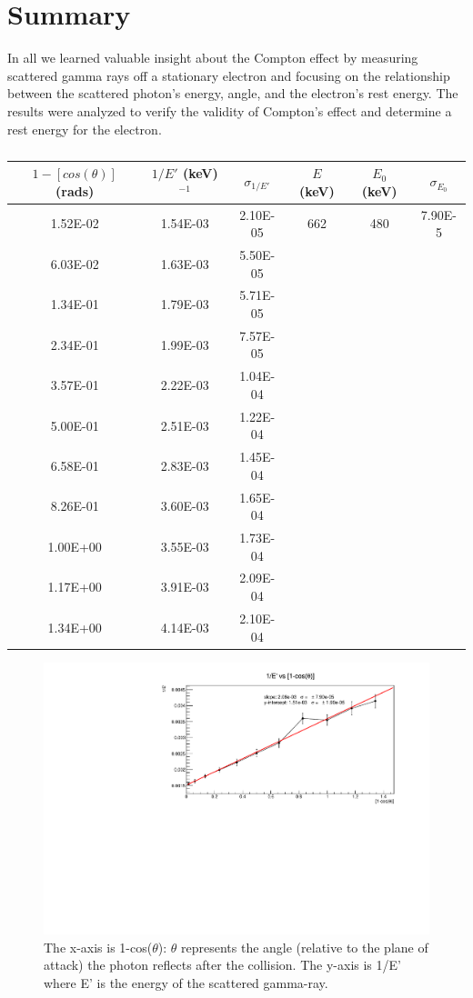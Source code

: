 \documentclass[a4paper,12pt,english]{all-in-one} %
\begin{document}
\section*{Summary}
{
 In all we learned valuable insight about the Compton effect by measuring scattered gamma rays off a stationary electron and focusing on the relationship between the scattered photon’s energy, angle, and the electron’s rest energy. The results were analyzed to verify the validity of Compton's effect and determine a rest energy for the electron.
}

\begin{table}[!]
\centering
\begin{tabular}{c|c|c|c|c|c} 
$1-[cos(\theta)]$ (rads) & $1/E'$ (keV)$^{-1}$  & $\sigma_{1/E'}$ & $E$ (keV)  &$E_0$ (keV) & $\sigma_{E_0}$ \\ \hline

1.52E-02 & 1.54E-03 & 2.10E-05 & 662 & 480 & 7.90E-5 \\
6.03E-02 & 1.63E-03 & 5.50E-05 &  &  &  \\
1.34E-01 & 1.79E-03 & 5.71E-05 &  &  & \\
2.34E-01 & 1.99E-03 & 7.57E-05 &  &  &  \\
3.57E-01 & 2.22E-03 & 1.04E-04 &  &  &  \\
5.00E-01 & 2.51E-03 & 1.22E-04 &  &  &  \\
6.58E-01 & 2.83E-03 & 1.45E-04 &  &  &  \\
8.26E-01 & 3.60E-03 & 1.65E-04 &  &  &  \\
1.00E+00 & 3.55E-03 & 1.73E-04 &  &  &  \\
1.17E+00 & 3.91E-03 & 2.09E-04 &  &  &  \\
1.34E+00 & 4.14E-03 & 2.10E-04 &  &  &  \\
\end{tabular}
\caption{}
\label{tab:data_compton}
\end{table}

\begin{figure}[tbh]
    \centering
    \includegraphics[width=1.0\linewidth]{6-compton/images/COMPTON-DATA.pdf}
    \caption{ The x-axis is 1-cos($\theta$):  $\theta$ represents the angle (relative to the plane of attack) the photon reflects after the collision. The y-axis is 1/E' where E' is the energy of the scattered gamma-ray.
    }
    \label{fig:compton-plot}
\end{figure}
\end{document}
